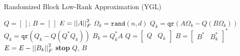 \begin{algorithm}[p]
\caption{Randomized Block Low-Rank Approximation (YGL)
    \cite[Algorithm 2]{yu2018efficient}}
\label{alg:rand_low_rank_YGL}
\begin{algorithmic}[1]
\State $Q = [\,]$; $B = [\,]$
\State $E = \left| \left| A \right| \right|_{F}^{2}$
        \State $\Omega_{k} = \texttt{rand}(n,d)$
        \State $Q_{k} = \texttt{qr}(A\Omega_{k} - Q(B\Omega_{k}))$
        \State $Q_{k} = \texttt{qr}(Q_{k} -Q (Q^{*}Q_{k}))$
            \label{alg_line:rand_YGL_GS}
        \State $B_{k} = Q_{k}^{*}A$
        \State $Q = \begin{bmatrix} Q & Q_{k} \end{bmatrix}$
        \State $B = \begin{bmatrix} B^{*} & B_{k}^{*} \end{bmatrix}^{*}$
        \State $E = E - \left| \left| B_{k} \right| \right|_{F}^{2}$
            \State \textbf{stop}
        \EndIf
    \EndFor
\State \Return $Q$, $B$
\EndFunction
\end{algorithmic}
\end{algorithm}
